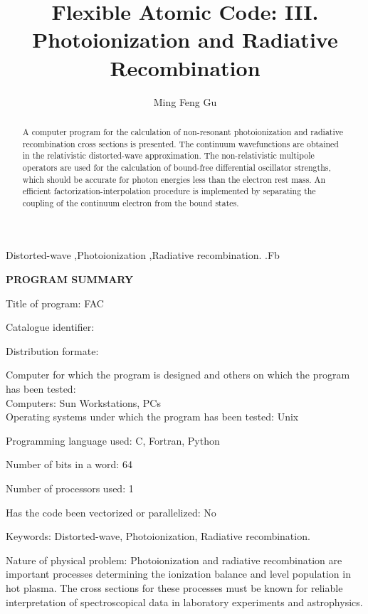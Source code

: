 \documentclass{elsart}
\begin{document}
\begin{frontmatter}

\title{Flexible Atomic Code: III. Photoionization and Radiative Recombination} 
\author{Ming Feng Gu}
\address{Massachusetts Institute of Technology, Cambridge, MA 02139, USA}

\begin{abstract} 
A computer program for the calculation of non-resonant photoionization and
radiative recombination cross sections is presented. The continuum
wavefunctions are obtained in the relativistic distorted-wave
approximation. The non-relativistic multipole operators are used for the
calculation of bound-free differential oscillator strengths, which should be
accurate for photon energies less than the electron rest mass. An efficient
factorization-interpolation procedure is implemented by separating the
coupling of the continuum electron from the bound states.
\end{abstract}

\begin{keyword}
Distorted-wave \sep Photoionization \sep Radiative recombination. 
.Fb
\end{keyword}
\end{frontmatter}

\textbf{\large PROGRAM SUMMARY}

Title of program: FAC

Catalogue identifier:

Distribution formate:

Computer for which the program is designed and others on which the program has
been tested:\\
Computers: Sun Workstations, PCs\\
Operating systems under which the program has been tested: Unix

Programming language used: C, Fortran, Python

Number of bits in a word: 64

Number of processors used: 1

Has the code been vectorized or parallelized: No

Keywords: Distorted-wave, Photoionization, Radiative recombination.

Nature of physical problem: Photoionization and radiative recombination are
important processes determining the ionization balance and level population in
hot plasma. The cross sections for these processes must be known for reliable
interpretation of spectroscopical data in laboratory experiments and
astrophysics. 
\end{document}
